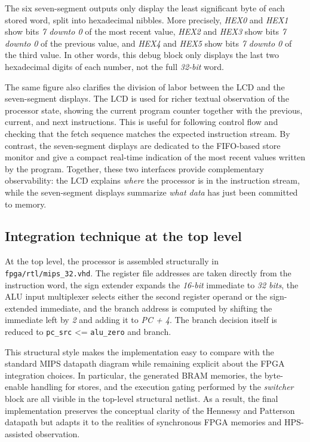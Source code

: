\documentclass[a4paper,11pt]{scrartcl}
\begin{document}
The six seven-segment outputs only display the least significant byte of each stored word, split into hexadecimal nibbles. More precisely, \emph{HEX0} and \emph{HEX1} show bits \emph{7 downto 0} of the most recent value, \emph{HEX2} and \emph{HEX3} show bits \emph{7 downto 0} of the previous value, and \emph{HEX4} and \emph{HEX5} show bits \emph{7 downto 0} of the third value. In other words, this debug block only displays the last two hexadecimal digits of each number, not the full \emph{32-bit} word.

The same figure also clarifies the division of labor between the LCD and the seven-segment displays. The LCD is used for richer textual observation of the processor state, showing the current program counter together with the previous, current, and next instructions. This is useful for following control flow and checking that the fetch sequence matches the expected instruction stream. By contrast, the seven-segment displays are dedicated to the FIFO-based store monitor and give a compact real-time indication of the most recent values written by the program. Together, these two interfaces provide complementary observability: the LCD explains \emph{where} the processor is in the instruction stream, while the seven-segment displays summarize \emph{what data} has just been committed to memory.
\subsection{Integration technique at the top level}
\label{sec:org37a3d03}

At the top level, the processor is assembled structurally in \texttt{fpga/rtl/mips\_32.vhd}. The register file addresses are taken directly from the instruction word, the sign extender expands the \emph{16-bit} immediate to \emph{32 bits}, the ALU input multiplexer selects either the second register operand or the sign-extended immediate, and the branch address is computed by shifting the immediate left by \emph{2} and adding it to \emph{PC + 4}. The branch decision itself is reduced to \texttt{pc\_src} <= \texttt{alu\_zero} and branch.

This structural style makes the implementation easy to compare with the standard MIPS datapath diagram while remaining explicit about the FPGA integration choices. In particular, the generated BRAM memories, the byte-enable handling for stores, and the execution gating performed by the \emph{switcher} block are all visible in the top-level structural netlist. As a result, the final implementation preserves the conceptual clarity of the Hennessy and Patterson datapath but adapts it to the realities of synchronous FPGA memories and HPS-assisted observation.
\end{document}
